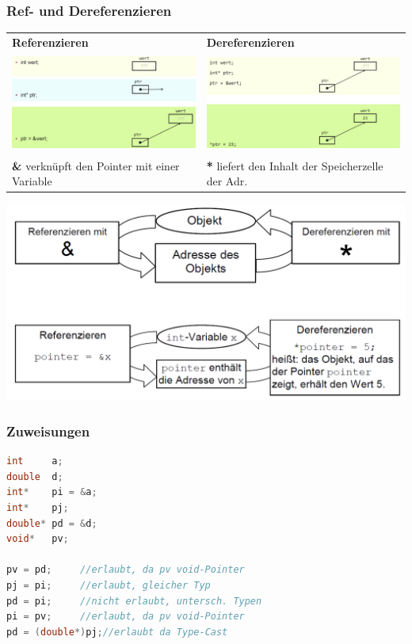 		\subsubsection{Ref- und Dereferenzieren}
			\begin{tabular}{l|l}
				\textbf{Referenzieren} & \textbf{Dereferenzieren} \\
				\includegraphics[height=3.2cm]{Bilder/referenzieren.png} &  \includegraphics[height=3.2cm]{Bilder/dereferenzieren.png} \\
				\textbf{\&} verknüpft den Pointer mit einer Variable   &  \textbf{*} liefert den Inhalt der Speicherzelle der Adr. \\
			\end{tabular}

			\begin{minipage}{1\linewidth}
				\includegraphics[width=0.5\linewidth]{Bilder/vergl-ref-deref.png}
			\end{minipage}


		\subsubsection{Zuweisungen}
			\begin{lstlisting}[language=C]
int     a;
double  d;
int*    pi = &a;
int*    pj;
double* pd = &d;
void*   pv; 

pv = pd;	 //erlaubt, da pv void-Pointer
pj = pi;	 //erlaubt, gleicher Typ
pd = pi;	 //nicht erlaubt, untersch. Typen
pi = pv;	 //erlaubt, da pv void-Pointer
pd = (double*)pj;//erlaubt da Type-Cast
			\end{lstlisting}
		
